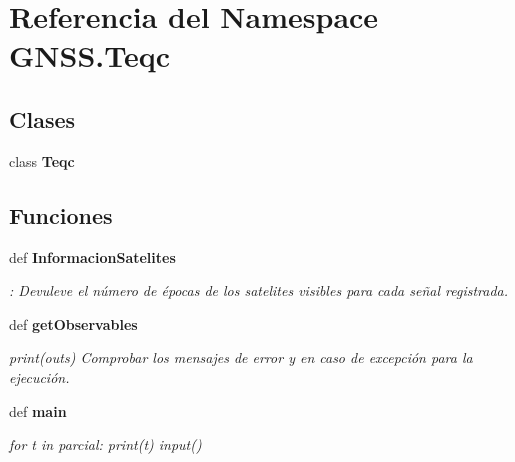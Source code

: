 \section{Referencia del Namespace G\-N\-S\-S.\-Teqc}
\label{namespaceGNSS_1_1Teqc}
\subsection*{Clases}
\begin{DoxyCompactItemize}
\item 
class {\bf Teqc}
\end{DoxyCompactItemize}
\subsection*{Funciones}
\begin{DoxyCompactItemize}
\item 
def {\bf Informacion\-Satelites}
\begin{DoxyCompactList}\small\item\em \-: Devuleve el número de épocas de los satelites visibles para cada señal registrada. \end{DoxyCompactList}\item 
def {\bf get\-Observables}
\begin{DoxyCompactList}\small\item\em print(outs) Comprobar los mensajes de error y en caso de excepción para la ejecución. \end{DoxyCompactList}\item 
def {\bf main}
\begin{DoxyCompactList}\small\item\em for t in parcial\-: print(t) input() \end{DoxyCompactList}\end{DoxyCompactItemize}
